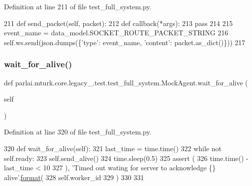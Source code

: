 Definition at line 211 of file test\+\_\+full\+\_\+system.\+py.


\begin{DoxyCode}
211     \textcolor{keyword}{def }send\_packet(self, packet):
212         \textcolor{keyword}{def }callback(*args):
213             \textcolor{keywordflow}{pass}
214 
215         event\_name = data\_model.SOCKET\_ROUTE\_PACKET\_STRING
216         self.ws.send(json.dumps(\{\textcolor{stringliteral}{'type'}: event\_name, \textcolor{stringliteral}{'content'}: packet.as\_dict()\}))
217 
\end{DoxyCode}
\mbox{\label{classparlai_1_1mturk_1_1core_1_1legacy__2018_1_1test_1_1test__full__system_1_1MockAgent_a7a7a7110be3ed9726d8185f6ddb7cdef}} 
\subsubsection{\texorpdfstring{wait\+\_\+for\+\_\+alive()}{wait\_for\_alive()}}
{\footnotesize\ttfamily def parlai.\+mturk.\+core.\+legacy\+\_.\+test.\+test\+\_\+full\+\_\+system.\+Mock\+Agent.\+wait\+\_\+for\+\_\+alive (\begin{DoxyParamCaption}\item[{}]{self }\end{DoxyParamCaption})}



Definition at line 320 of file test\+\_\+full\+\_\+system.\+py.


\begin{DoxyCode}
320     \textcolor{keyword}{def }wait\_for\_alive(self):
321         last\_time = time.time()
322         \textcolor{keywordflow}{while} \textcolor{keywordflow}{not} self.ready:
323             self.send\_alive()
324             time.sleep(0.5)
325             \textcolor{keyword}{assert} (
326                 time.time() - last\_time < 10
327             ), \textcolor{stringliteral}{'Timed out wating for server to acknowledge \{\} alive'}.\hyperlink{namespaceparlai_1_1chat__service_1_1services_1_1messenger_1_1shared__utils_a32e2e2022b824fbaf80c747160b52a76}{format}(
328                 self.worker\_id
329             )
330 
331 
\end{DoxyCode}


